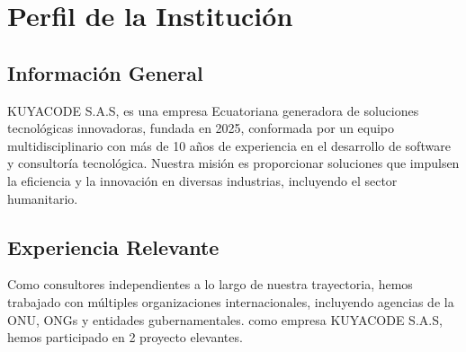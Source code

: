 \section{Perfil de la Institución}
\label{sec:perfil_institucion}

\subsection{Información General}

KUYACODE S.A.S, es una empresa Ecuatoriana generadora de soluciones tecnológicas innovadoras, fundada en 2025, conformada por un equipo multidisciplinario con más de 10 años de experiencia en el desarrollo de software y consultoría tecnológica. Nuestra misión es proporcionar soluciones que impulsen la eficiencia y la innovación en diversas industrias, incluyendo el sector humanitario.

\subsection{Experiencia Relevante}

Como consultores independientes a lo largo de nuestra trayectoria, hemos trabajado con múltiples organizaciones internacionales, incluyendo agencias de la ONU, ONGs y entidades gubernamentales. como empresa KUYACODE S.A.S, hemos participado en 2 proyecto elevantes.

